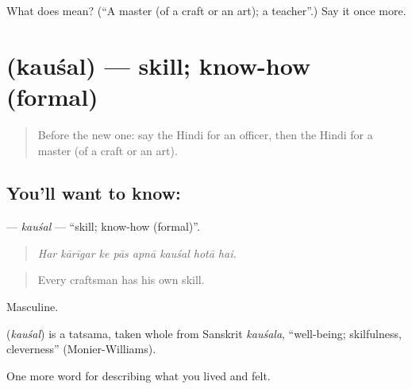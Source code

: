 \begin{tcolorbox}[breakable,colback=teal!4,colframe=teal!35!black,title={Before you move on}]
What does  mean? (\textquotedblleft{}A master (of a craft or an art); a teacher\textquotedblright{}.) Say it once more.
\end{tcolorbox}
\section[\texorpdfstring{\hi{कौशल} (kauśal)}{कौशल (kauśal)}]{ (kauśal) — skill; know-how (formal)}

\label{lesson:HI-C507-kausal}



\begin{quote}
Before the new one: say the Hindi for an officer, then the Hindi for a master (of a craft or an art).
\end{quote}

\subsection*{You'll want to know: }
\textbf{} — \emph{kauśal} — \textquotedblleft{}skill; know-how (formal)\textquotedblright{}.

\begin{quote}
       
\end{quote}

\begin{quote}
\emph{Har kārīgar ke pās apnā kauśal hotā hai.}
\end{quote}

\begin{quote}
Every craftsman has his own skill.
\end{quote}

Masculine.

\begin{cousinweb}
\textbf{} (\emph{kauśal}) is a tatsama, taken whole from Sanskrit \emph{kauśala}, \textquotedblleft{}well-being; skilfulness, cleverness\textquotedblright{} (Monier-Williams).
\end{cousinweb}

\begin{grammarlens}[title={What you've built}]
One more word for describing what you lived and felt.
\end{grammarlens}


